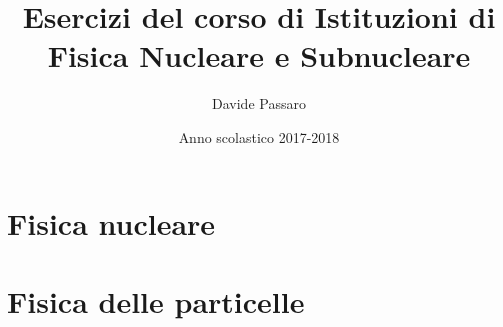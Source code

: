 \documentclass[10pt, a4paper]{article}
\title{Esercizi del corso di Istituzioni di Fisica Nucleare e Subnucleare}
\author{Davide Passaro}
\date{Anno scolastico 2017-2018}
\theoremstyle{plain}
\begin{document}
	\maketitle
	\section{Fisica nucleare}
		
		\newpage
		
		\newpage
		
		\newpage
		
		\newpage
	\section{Fisica delle particelle}

		
		\newpage
		
\end{document}
